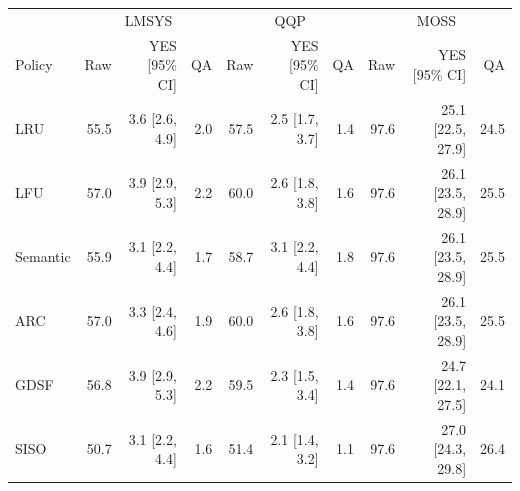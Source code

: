 \begin{tabular}{l rrr rrr rrr}
\toprule
 & \multicolumn{3}{c}{LMSYS} & \multicolumn{3}{c}{QQP} & \multicolumn{3}{c}{MOSS} \\
Policy & Raw & YES [95\% CI] & QA & Raw & YES [95\% CI] & QA & Raw & YES [95\% CI] & QA \\
\midrule
LRU & 55.5 & 3.6 [2.6, 4.9] & 2.0 & 57.5 & 2.5 [1.7, 3.7] & 1.4 & 97.6 & 25.1 [22.5, 27.9] & 24.5 \\
LFU & 57.0 & 3.9 [2.9, 5.3] & 2.2 & 60.0 & 2.6 [1.8, 3.8] & 1.6 & 97.6 & 26.1 [23.5, 28.9] & 25.5 \\
Semantic & 55.9 & 3.1 [2.2, 4.4] & 1.7 & 58.7 & 3.1 [2.2, 4.4] & 1.8 & 97.6 & 26.1 [23.5, 28.9] & 25.5 \\
ARC & 57.0 & 3.3 [2.4, 4.6] & 1.9 & 60.0 & 2.6 [1.8, 3.8] & 1.6 & 97.6 & 26.1 [23.5, 28.9] & 25.5 \\
GDSF & 56.8 & 3.9 [2.9, 5.3] & 2.2 & 59.5 & 2.3 [1.5, 3.4] & 1.4 & 97.6 & 24.7 [22.1, 27.5] & 24.1 \\
SISO & 50.7 & 3.1 [2.2, 4.4] & 1.6 & 51.4 & 2.1 [1.4, 3.2] & 1.1 & 97.6 & 27.0 [24.3, 29.8] & 26.4 \\
\bottomrule
\end{tabular}
